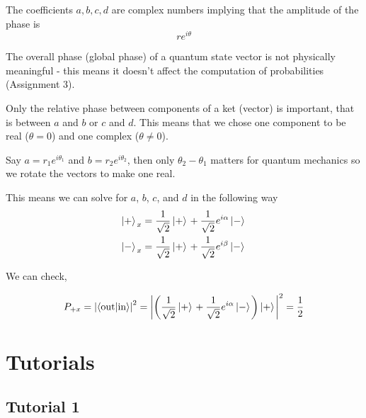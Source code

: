 \documentclass[english, 11pt]{article}
\begin{document}
          The coefficients $a,b,c,d$ are complex numbers implying that the amplitude of the phase is
          \[ re^{i\theta} \]
          \begin{note}
            The overall phase (global phase) of a quantum state vector is not physically meaningful - this means it doesn't affect the computation of probabilities (Assignment 3).
          \end{note}

          Only the relative phase between components of a ket (vector) is important, that is between $a$ and $b$ or $c$ and $d$. This means that we chose one component to be real ($\theta = 0$) and one complex ($\theta \not = 0$).
          \newline

          Say $a = r_1e^{i\theta_1}$ and $b = r_2e^{i\theta_2}$, then only $\theta_2 - \theta_1$ matters for quantum mechanics so we rotate the vectors to make one real. \newline

          This means we can solve for $a$, $b$, $c$, and $d$ in the following way
          \begin{align*}
            \left| + \rangle \right._x & = \frac{1}{\sqrt{2}}\left| + \rangle \right. + \frac{1}{\sqrt{2}}e^{i\alpha}\left| - \rangle \right. \\
            \left| - \rangle \right._x & = \frac{1}{\sqrt{2}}\left| + \rangle \right. + \frac{1}{\sqrt{2}}e^{i\beta}\left| - \rangle \right.
          \end{align*}

          We can check,

          \[ P_{+x} = \left| \langle \mbox{out} | \mbox{in} \rangle \right|^2 = \left| \left( \frac{1}{\sqrt{2}}\left| + \rangle \right. + \frac{1}{\sqrt{2}}e^{i\alpha}\left| - \rangle \right. \right) \left| + \rangle \right. \right|^2 = \frac{1}{2}\]



   \section{Tutorials}

     \subsection{Tutorial 1}
\end{document}
